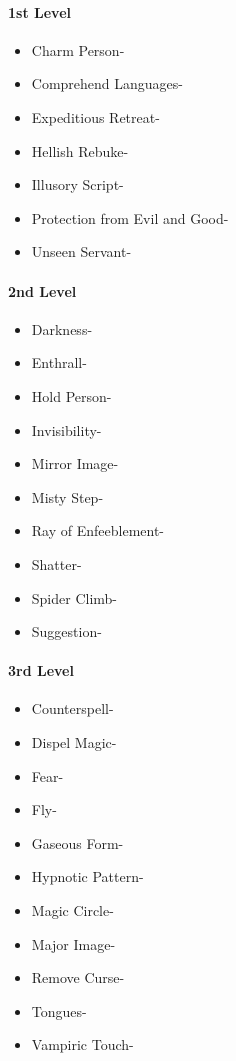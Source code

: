 \documentclass[
]{article}
\providecommand{\tightlist}{%
  \setlength{\itemsep}{0pt}\setlength{\parskip}{0pt}}
\begin{document}
\hypertarget{1st-level-6}{%
\paragraph{1st Level}\label{1st-level-6}}

\begin{itemize}
\tightlist
\item
  Charm Person-
\item
  Comprehend Languages-
\item
  Expeditious Retreat-
\item
  Hellish Rebuke-
\item
  Illusory Script-
\item
  Protection from Evil and Good-
\item
  Unseen Servant-
\end{itemize}

\hypertarget{2nd-level-6}{%
\paragraph{2nd Level}\label{2nd-level-6}}

\begin{itemize}
\tightlist
\item
  Darkness-
\item
  Enthrall-
\item
  Hold Person-
\item
  Invisibility-
\item
  Mirror Image-
\item
  Misty Step-
\item
  Ray of Enfeeblement-
\item
  Shatter-
\item
  Spider Climb-
\item
  Suggestion-
\end{itemize}

\hypertarget{3rd-level-6}{%
\paragraph{3rd Level}\label{3rd-level-6}}

\begin{itemize}
\tightlist
\item
  Counterspell-
\item
  Dispel Magic-
\item
  Fear-
\item
  Fly-
\item
  Gaseous Form-
\item
  Hypnotic Pattern-
\item
  Magic Circle-
\item
  Major Image-
\item
  Remove Curse-
\item
  Tongues-
\item
  Vampiric Touch-
\end{itemize}
\end{document}
